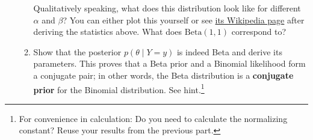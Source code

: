 \documentclass[submit]{harvardml}
\begin{document}
\begin{problem}
\begin{enumerate}
\begin{enumerate}
      Qualitatively speaking, what does this distribution look like for different $\alpha$ and $\beta$? You can either plot this yourself or see \href{https://en.wikipedia.org/wiki/Beta_distribution}{its Wikipedia page} after deriving the statistics above. What does $\mathrm{Beta}(1, 1)$ correspond to?

      \item 
      Show that the posterior
      \(p(\theta \mid Y=y)\) is indeed Beta and derive its parameters. This proves that a Beta prior and a Binomial likelihood form a conjugate pair; in other words, the Beta distribution is a \textbf{conjugate prior} for the Binomial distribution. See hint.\footnote{For convenience in calculation: Do you need to calculate the normalizing constant? Reuse your results from the previous part.}
    \end{enumerate}
  
\end{enumerate}
\end{problem}
\end{document}
